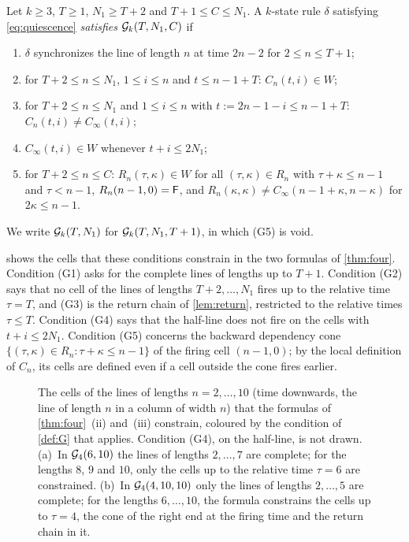\begin{definition}\label{def:G}
Let $k\ge3$, $T\ge1$, $N_1\ge T+2$ and $T+1\le C\le N_1$. A $k$-state rule
$\delta$ satisfying \eqref{eq:quiescence} \emph{satisfies $\mathcal G_k(T,N_1,C)$} if
\begin{enumerate}[(G1)]
\item $\delta$ synchronizes the line of length $n$ at time $2n-2$ for $2\le
n\le T+1$;
\item for $T+2\le n\le N_1$, $1\le i\le n$ and $t\le n-1+T$: $C_n(t,i)\in W$;
\item for $T+2\le n\le N_1$ and $1\le i\le n$ with $t:=2n-1-i\le n-1+T$:
$C_n(t,i)\ne C_\infty(t,i)$;
\item $C_\infty(t,i)\in W$ whenever $t+i\le 2N_1$;
\item for $T+2\le n\le C$: $R_n(\tau,\kappa)\in W$ for all $(\tau,\kappa)\in
R_n$ with $\tau+\kappa\le n-1$ and $\tau<n-1$, $R_n(n-1,0)=\mathsf F$, and
$R_n(\kappa,\kappa)\ne C_\infty(n-1+\kappa,n-\kappa)$ for $2\kappa\le n-1$.
\end{enumerate}
We write $\mathcal G_k(T,N_1)$ for $\mathcal G_k(T,N_1,T+1)$, in which (G5) is void.
\end{definition}

 shows the cells that these conditions constrain in the
two formulas of \cref{thm:four}. Condition (G1) asks for the complete lines of
lengths up to $T+1$. Condition
(G2) says that no cell of the lines of lengths $T+2,\dots,N_1$ fires up to the
relative time $\tau=T$, and (G3) is the return chain of \cref{lem:return},
restricted to the relative times $\tau\le T$. Condition (G4) says that the
half-line does not fire on the cells with $t+i\le 2N_1$. Condition (G5)
concerns the backward dependency cone $\{(\tau,\kappa)\in R_n:\tau+\kappa\le
n-1\}$ of the firing cell $(n-1,0)$; by the local definition of $C_n$, its
cells are defined even if a cell outside the cone fires earlier.

\begin{figure}[t]
\centering

\caption{The cells of the lines of lengths $n=2,\dots,10$ (time downwards,
the line of length $n$ in a column of width $n$) that the formulas of
\cref{thm:four}~(ii) and~(iii) constrain, coloured by the condition of
\cref{def:G} that applies. Condition (G4), on the half-line, is not drawn.
(a)~In $\mathcal G_4(6,10)$ the lines of lengths $2,\dots,7$ are complete; for the
lengths $8$, $9$ and $10$, only the cells up to the relative time $\tau=6$ are
constrained. (b)~In $\mathcal G_4(4,10,10)$ only the lines of lengths $2,\dots,5$ are
complete; for the lengths $6,\dots,10$, the formula constrains the cells up to
$\tau=4$, the cone of the right end at the firing time and the return chain in
it.}
\label{fig:regions}
\end{figure}

